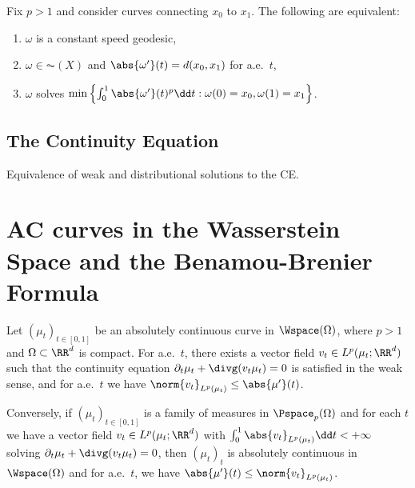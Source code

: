 \documentclass[oneside,reqno,letterpaper]{amsart}
\begin{document}
\begin{proposition}
  Fix \(p > 1\) and consider curves connecting \(x_0\) to \(x_1\).
  The following are equivalent:
  \begin{enumerate}[label=(\roman*)]
    \item \(\omega\) is a constant speed geodesic,
    \item \(\omega \in \AC(X)\) and \(\abs{\omega'}(t) = d(x_0, x_1)\) for a.e.\ \(t\),
    \item \(\omega\) solves \(\min\left\{\int_0^1 \abs{\omega'}(t)^p \dd t: \omega(0) = x_0, \omega(1) = x_1 \right\}\).
  \end{enumerate}
\end{proposition}



\subsection{The Continuity Equation}
\begin{definition}
\end{definition}

\begin{proposition}
Equivalence of weak and distributional solutions to the CE.
\end{proposition}




\section{AC curves in the Wasserstein Space and the Benamou-Brenier Formula}
\begin{theorem}
  Let \((\mu_t)_{t \in [0, 1]}\) be an absolutely continuous curve in \(\Wspace(\Omega)\), where \(p > 1\) and \(\Omega \subset \RR^d\) is compact.
  For a.e.\ \(t\), there exists a vector field \(v_t \in L^p(\mu_t; \RR^d)\) such that the continuity equation \(\partial_t \mu_t + \divg (v_t \mu_t) = 0\) is satisfied in the weak sense, and for a.e.\ \(t\) we have \(\norm{v_t}_{L^p(\mu_t)} \leq \abs{\mu'}(t)\).

  Conversely, if \((\mu_t)_{t \in [0, 1]}\) is a family of measures in \(\Pspace_p(\Omega)\) and for each \(t\) we have a vector field \(v_t \in L^p(\mu_t; \RR^d)\) with \(\int_0^1 \abs{v_t}_{L^p(\mu_t)} \dd t < +\infty\) solving \(\partial_t \mu_t + \divg (v_t \mu_t) = 0\), then \((\mu_t)_t\) is absolutely continuous in \(\Wspace(\Omega)\) and for a.e.\ \(t\), we have \(\abs{\mu'}(t) \leq \norm{v_t}_{L^p(\mu_t)}\).
\end{theorem}
\end{document}
